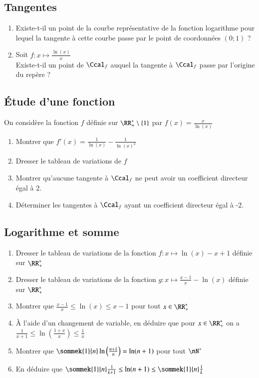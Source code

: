 \documentclass[oneside,12pt]{article}          %
\begin{document}
\subsection{Tangentes}
\begin{enumerate}
    \item Existe-t-il un point de la courbe représentative de la fonction logarithme pour lequel la tangente à cette courbe passe par le point de coordonnées $(0;1)$ ?
    \item Soit $f:x\mapsto\frac{\ln(x)}{x}$\\
    Existe-t-il un point de $\Ccal_f$ auquel la tangente à $\Ccal_f$ passe par l'origine du repère ?
\end{enumerate}



\subsection{Étude d'une fonction}
On considère la fonction $f$ définie sur $\RR_+^*\setminus\{1\}$ par $f(x)=\frac{x}{\ln(x)}$
\begin{enumerate}
    \item Montrer que $f'(x)=\frac{1}{\ln(x)}-\frac{1}{\ln(x)^2}$
    \item Dresser le tableau de variations de $f$
    \item Montrer qu'aucune tangente à $\Ccal_f$ ne peut avoir un coefficient directeur égal à 2.
    \item Déterminer les tangentes à $\Ccal_f$ ayant un coefficient directeur égal à -2.
\end{enumerate}



\subsection{Logarithme et somme}
\begin{enumerate}
	\item Dresser le tableau de variations de la fonction $f:x\mapsto \ln(x)-x+1$ définie sur $\RR_+^*$
	\item Dresser le tableau de variations de la fonction $g:x\mapsto \frac{x-1}{x}-\ln(x)$ définie sur $\RR_+^*$
    \item Montrer que $\frac{x-1}{x}\leq\ln(x)\leq x-1$ pour tout $x\in\RR^*_+$ 
    \item À l'aide d'un changement de variable, en déduire que pour $x\in\RR^*_+$ on a $\frac{1}{x+1}\leq\ln\left(\frac{1+x}{x}\right)\leq\frac{1}{x}$
    \item Montrer que $\sommek{1}{n}\ln\left(\frac{n+1}{n}\right)=\ln(n+1)$ pour tout $\nN^*$
    \item En déduire que $\sommek{1}{n} \frac{1}{k+1} \leq \ln(n+1) \leq \sommek{1}{n} \frac{1}{k}$
\end{enumerate}
\end{document}
